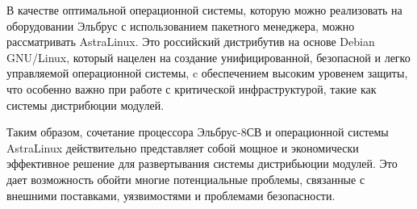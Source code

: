 В качестве оптимальной операционной системы, которую можно реализовать на оборудовании Эльбрус с использованием пакетного менеджера, можно рассматривать AstraLinux. Это российский дистрибутив на основе Debian GNU/Linux, который нацелен на создание унифицированной, безопасной и легко управляемой операционной системы, c обеспечением высоким уровенем защиты, что особенно важно при работе с критической инфраструктурой, такие как системы дистрибюции модулей.

Таким образом, сочетание процессора Эльбрус-8СВ и операционной системы AstraLinux действительно представляет собой мощное и экономически эффективное решение для развертывания системы дистрибьюции модулей. Это дает возможность обойти многие потенциальные проблемы, связанные с внешними поставками, уязвимостями и проблемами безопасности.



